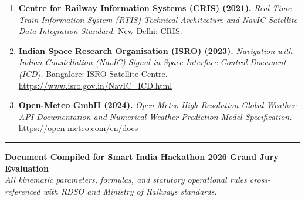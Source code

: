 \documentclass[10pt, a4paper]{article}
\begin{document}
\begin{enumerate}[leftmargin=5mm, itemsep=1.5pt]
  \item \textbf{Centre for Railway Information Systems (CRIS) (2021).} \textit{Real-Time Train Information System (RTIS) Technical Architecture and NavIC Satellite Data Integration Standard.} New Delhi: CRIS.
  \item \textbf{Indian Space Research Organisation (ISRO) (2023).} \textit{Navigation with Indian Constellation (NavIC) Signal-in-Space Interface Control Document (ICD).} Bangalore: ISRO Satellite Centre. \url{https://www.isro.gov.in/NavIC_ICD.html}
  \item \textbf{Open-Meteo GmbH (2024).} \textit{Open-Meteo High-Resolution Global Weather API Documentation and Numerical Weather Prediction Model Specification.} \url{https://open-meteo.com/en/docs}
\end{enumerate}

\vspace{2mm}
\noindent\rule{\textwidth}{0.8pt}
\begin{center}
  \footnotesize\textbf{Document Compiled for Smart India Hackathon 2026 Grand Jury Evaluation}\\
  \textit{All kinematic parameters, formulas, and statutory operational rules cross-referenced with RDSO and Ministry of Railways standards.}
\end{center}
\end{document}
